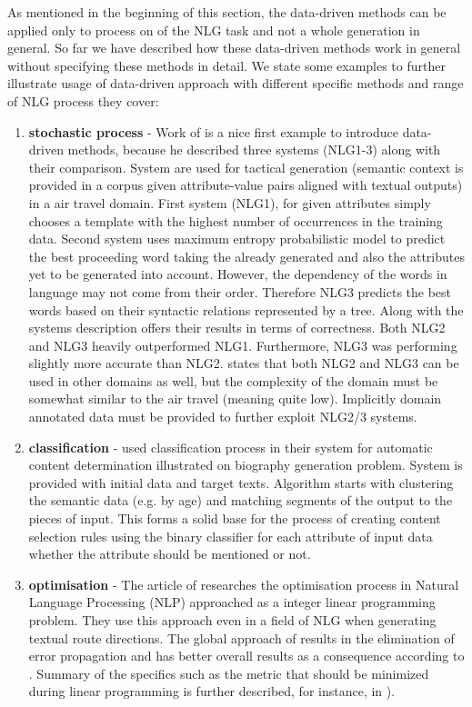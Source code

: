 As mentioned in the beginning of this section, the data-driven methods can be applied only to process on of the NLG task and not a whole generation in general. So far we have described how these data-driven methods work in general without specifying these methods in detail. We state some examples to further illustrate usage of data-driven approach with different specific methods and range of NLG process they cover:
\begin{enumerate}
	\item \textbf{stochastic process} - Work of \cite{ratnaparkhi2000trainable} is a nice first example to introduce data-driven methods, because he described three systems (NLG1-3) along with their comparison. System are used for tactical generation (semantic context is provided in a corpus given attribute-value pairs aligned with textual outputs) in a air travel domain. First system (NLG1), for given attributes simply chooses a template with the highest number of occurrences in the training data. Second system uses maximum entropy probabilistic model to predict the best proceeding  word taking the already generated and also the attributes yet to be generated into account. However, the dependency of the words in language may not come from their order. Therefore NLG3 predicts the best words based on their syntactic relations represented by a tree. Along with the systems description \cite{ratnaparkhi2000trainable} offers their results in terms of correctness. Both NLG2 and NLG3 heavily outperformed NLG1. Furthermore, NLG3 was performing slightly more accurate than NLG2.  \cite{ratnaparkhi2000trainable} states that both NLG2 and NLG3 can be used in other domains as well, but the complexity of the domain must be somewhat similar to the air travel (meaning quite low). Implicitly domain annotated data must be provided to further exploit NLG2/3 systems.\label{dd-1}
	\item \textbf{classification} - \cite{duboue2003statistical} used classification process in their system for automatic content determination illustrated on biography generation problem. System is provided with initial data and target texts. Algorithm starts with clustering the semantic data (e.g. by age) and matching segments of the output to the pieces of input. This forms a solid base for the process of creating content selection rules using the binary classifier for each attribute of input data whether the attribute should be mentioned or not.\label{dd-2}
	\item \textbf{optimisation} - The article of \cite{marciniak2005beyond} researches the optimisation process in Natural Language Processing (NLP) approached as a integer linear programming problem. They use this approach even in a field of NLG when generating textual route directions. The global approach of results in the elimination of error propagation and has better overall results as a consequence according to \cite{marciniak2005beyond}. Summary of the specifics such as the metric that should be minimized during linear programming is further described, for instance, in \cite{gatt2018survey}).\label{dd-3}

\end{enumerate}
